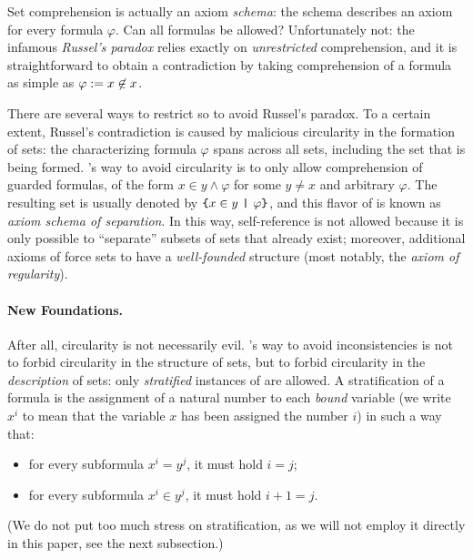 \documentclass[sigplan,10pt,anonymous,review]{acmart}%
\begin{document}
Set comprehension is actually an axiom \emph{schema}: the schema describes an axiom for every formula $\varphi$. Can all formulas be allowed? Unfortunately not: the infamous \emph{Russel's paradox} relies exactly on \emph{unrestricted} comprehension, and it is straightforward to obtain a contradiction by taking comprehension of a formula as simple as $\varphi := x \not\in x$.\footnotemark{}


There are several ways to restrict \SetCompr{} so to avoid Russel's paradox. To a certain extent, Russel's contradiction is caused by malicious circularity in the formation of sets: the characterizing formula $\varphi$ spans across all sets, including the set that is being formed. \ZF's way to avoid circularity is to only allow comprehension of guarded formulas, of the form $x \in y \land \varphi$ for some $y\neq x$ and arbitrary $\varphi$. The resulting set is usually denoted by $\text{\texttt{\{}} x \in y ~\text{\texttt{|}}~ \varphi \text{\texttt{\}}}$, and this flavor of \SetCompr{} is known as \emph{axiom schema of separation}. In this way, self-reference is not allowed because it is only possible to ``separate'' subsets of sets that already exist; moreover, additional axioms of \ZF{} force sets to have a \emph{well-founded} structure (most notably, the \emph{axiom of regularity}).

\paragraph{New Foundations.} After all, circularity is not necessarily evil. \NF's way to avoid inconsistencies is not to forbid circularity in the structure of sets, but to forbid circularity in the \emph{description} of sets: only \emph{stratified} instances of \SetCompr{} are allowed. A stratification of a formula is the assignment of a natural number to each \emph{bound} variable (we write $x^i$ to mean that the variable $x$ has been assigned the number $i$) in such a way that:
\begin{itemize}
  \item for every subformula $x^i = y^j$, it must hold $i=j$;
  \item for every subformula $x^i \in y^j$, it must hold $i+1=j$.
\end{itemize}
(We do not put too much stress on stratification, as we will not employ it directly in this paper, see the next subsection.)
\end{document}
